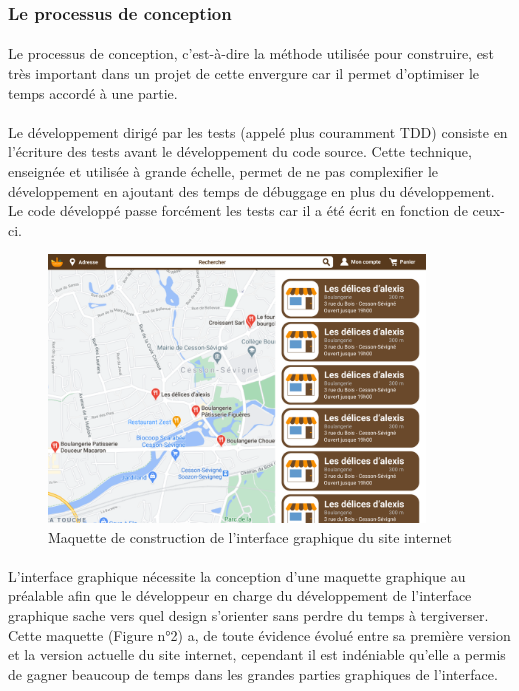 \documentclass[a4paper, 12pt]{article}
\begin{document}
\subsubsection{Le processus de conception}
\paragraph{}Le processus de conception, c’est-à-dire la méthode utilisée pour construire, est très important dans un projet de cette envergure car il permet d’optimiser le temps accordé à une partie.
\paragraph{}Le développement dirigé par les tests (appelé plus couramment TDD) consiste en l’écriture des tests avant le développement du code source. Cette technique, enseignée et utilisée à grande échelle, permet de ne pas complexifier le développement en ajoutant des temps de débuggage en plus du développement. Le code développé passe forcément les tests car il a été écrit en fonction de ceux-ci.

\begin{figure}[H]
	\begin{center}
		\includegraphics[width=10cm]{fig/maquette.png}
		\caption{Maquette de construction de l'interface graphique du site internet}
	\end{center}
\end{figure}

\paragraph{}L’interface graphique nécessite la conception d’une maquette graphique au préalable afin que le développeur en charge du développement de l’interface graphique sache vers quel design s’orienter sans perdre du temps à tergiverser. Cette maquette (Figure n°2) a, de toute évidence évolué entre sa première version et la version actuelle du site internet, cependant il est indéniable qu’elle a permis de gagner beaucoup de temps dans les grandes parties graphiques de l’interface.
\end{document}
